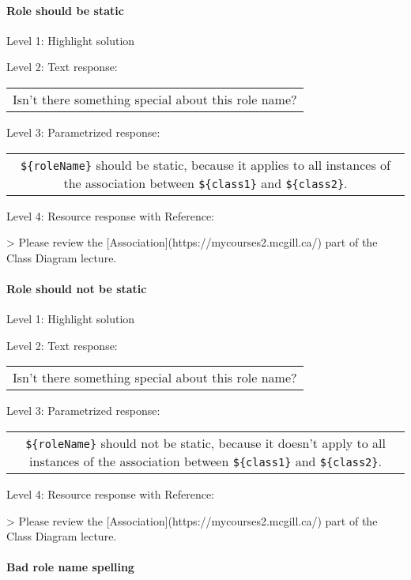 \paragraph{Role should be static}

\noindent Level 1: Highlight solution \medskip

\noindent Level 2: Text response: \medskip

\begin{tabular}{|c}
Isn't there something special about this role name?
\end{tabular} \medskip

\noindent Level 3: Parametrized response: \medskip

\begin{tabular}{|c}
\verb|${roleName}| should be static, because it applies to all instances of the association between \verb|${class1}| and \verb|${class2}|.
\end{tabular} \medskip

\noindent Level 4: Resource response with Reference:

> Please review the [Association](https://mycourses2.mcgill.ca/) part of the Class Diagram lecture.


\paragraph{Role should not be static}

\noindent Level 1: Highlight solution \medskip

\noindent Level 2: Text response: \medskip

\begin{tabular}{|c}
Isn't there something special about this role name?
\end{tabular} \medskip

\noindent Level 3: Parametrized response: \medskip

\begin{tabular}{|c}
\verb|${roleName}| should not be static, because it doesn't apply to all instances of the association between \verb|${class1}| and \verb|${class2}|.
\end{tabular} \medskip

\noindent Level 4: Resource response with Reference:

> Please review the [Association](https://mycourses2.mcgill.ca/) part of the Class Diagram lecture.


\paragraph{Bad role name spelling}

